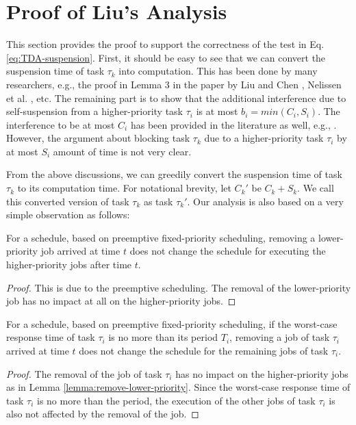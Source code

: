 
\section{Proof of Liu's Analysis}  

This section provides the proof to support the correctness of the test in Eq. \eqref{eq:TDA-suspension}. First, it should be easy to see that we can convert the suspension time of task $\tau_k$ into computation. This has been done by many researchers, e.g., the proof in Lemma 3 in the paper by Liu and Chen \cite{Liu_2014}, Nelissen et al. \cite{ecrts15nelissen}, etc. The remaining part is to show that the additional interference due to self-suspension from a higher-priority task $\tau_i$ is at most $b_i=min(C_i, S_i)$. The interference to be at most $C_i$ has been provided in the literature as well, e.g., \cite{Rajkumar_1990}\cite{Liu_2014}. However, the argument about blocking task $\tau_k$ due to a higher-priority task $\tau_i$ by at most $S_i$ amount of time is not very clear. 

From the above discussions, we can greedily convert the suspension time of task $\tau_k$ to its computation time. For notational brevity, let $C_k'$ be $C_k + S_k$. We call this converted version of task $\tau_k$ as task $\tau_k'$. Our analysis is also based on a very simple observation as follows:
\begin{lemma}
\label{lemma:remove-lower-priority}
  For a schedule, based on preemptive fixed-priority scheduling, removing a lower-priority job arrived at time $t$ does not change the schedule for executing the higher-priority jobs after time $t$.
\end{lemma}
\begin{proof}
  This is due to the preemptive scheduling. The removal of the lower-priority job has no impact at all on the higher-priority jobs.
\end{proof}
\begin{lemma}
\label{lemma:remove-same-task}
  For a schedule, based on preemptive fixed-priority scheduling, if the worst-case response time of task $\tau_i$ is no more than its period $T_i$, removing a job of task $\tau_i$ arrived at time $t$ does not change the schedule for the remaining jobs of task $\tau_i$.
\end{lemma}
\begin{proof}
  The removal of the job of task $\tau_i$ has no impact on the higher-priority jobs as in Lemma \ref{lemma:remove-lower-priority}. Since the worst-case response time of task $\tau_i$ is no more than the period, the execution of the other jobs of task $\tau_i$ is also not affected by the removal of the job.
\end{proof}

